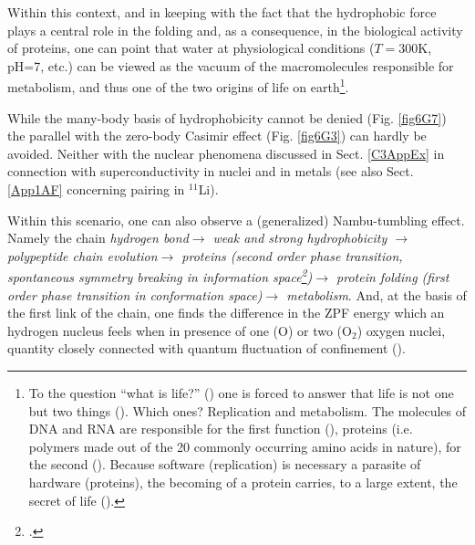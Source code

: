 \begin{subappendices}
Within this context, and in keeping with the fact that the hydrophobic force plays a central role in the folding and, as a consequence, in the biological activity of proteins, one can point that water at physiological conditions ($T=$300K, pH=7, etc.) can be viewed as the vacuum of the macromolecules responsible for metabolism, and thus one of the two origins of life on earth\footnote{To the question ``what is life?'' (\cite{Schrodinger:44}) one is forced to answer that life is not one but two things (\cite{Dyson:99}). Which ones? Replication and metabolism. The molecules of DNA and RNA are responsible for the first function (\cite{Watson:53,Watson:80}), proteins (i.e. polymers made out of the 20 commonly occurring amino acids in nature), for the second (\cite{Sanger:52}). Because software (replication) is necessary a parasite of hardware (proteins), the becoming of a protein carries, to a large extent, the secret of life (\cite{Monod:70}).}.


While the many-body basis of hydrophobicity cannot be denied (Fig. \ref{fig6G7}) the parallel with the zero-body Casimir effect (Fig. \ref{fig6G3}) can hardly be avoided. Neither with the nuclear phenomena  discussed in Sect. \ref{C3AppEx} in connection with superconductivity  in nuclei and in metals (see also Sect. \ref{App1AF} concerning pairing in $^{11}$Li).

Within this scenario, one can also observe a (generalized) Nambu-tumbling effect. Namely  the chain \textit{hydrogen bond$\to$ weak and strong hydrophobicity $\to$ polypeptide chain evolution$\to$ proteins (second order phase transition, spontaneous symmetry breaking in information space\footnote{\cite{Broglia:13b}.})$\to$ protein folding (first order phase transition in conformation space)$\to$ metabolism}. And, at the basis of the first link of the chain,  one finds the difference in the ZPF energy which an hydrogen nucleus feels when in presence of one (O) or two (O$_2$) oxygen nuclei, quantity closely connected with quantum fluctuation of confinement (\cite{Povh:02}).




\end{subappendices}
%
